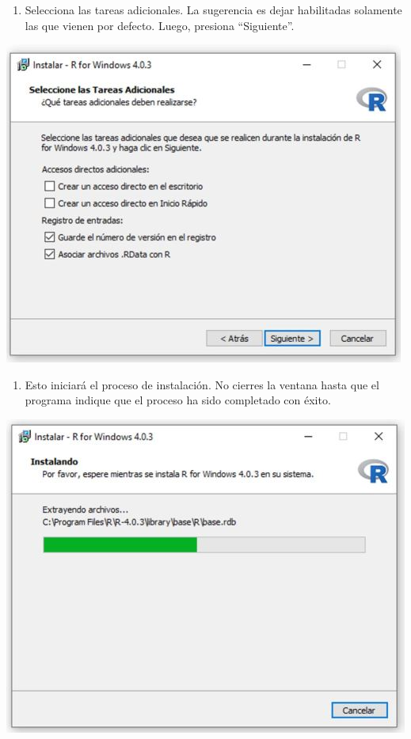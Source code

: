\documentclass[
]{book}
\providecommand{\tightlist}{%
  \setlength{\itemsep}{0pt}\setlength{\parskip}{0pt}}
\begin{document}
\begin{enumerate}
\def\labelenumi{\arabic{enumi}.}
\setcounter{enumi}{12}
\tightlist
\item
  Selecciona las tareas adicionales. La sugerencia es dejar habilitadas solamente las que vienen por defecto. Luego, presiona ``Siguiente''.
\end{enumerate}

\includegraphics{data/13.jpg}

\begin{enumerate}
\def\labelenumi{\arabic{enumi}.}
\setcounter{enumi}{13}
\tightlist
\item
  Esto iniciará el proceso de instalación. No cierres la ventana hasta que el programa indique que el proceso ha sido completado con éxito.
\end{enumerate}

\includegraphics{data/14.jpg}
\end{document}
